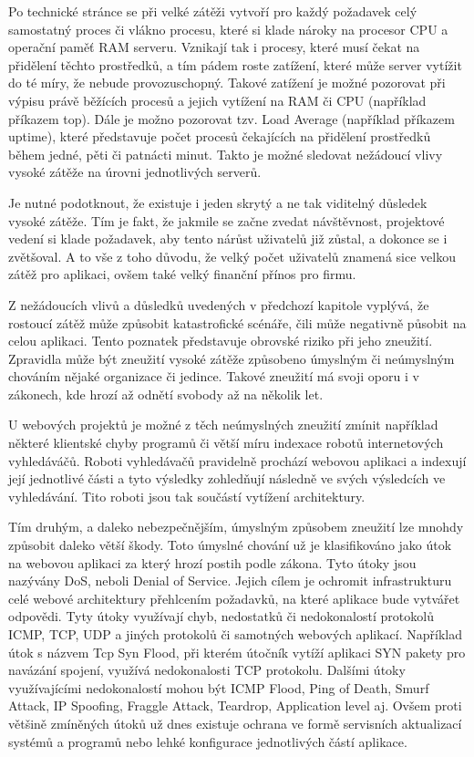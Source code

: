 \documentclass[12pt]{article}
\begin{document}
Po technické stránce se při velké zátěži vytvoří pro každý požadavek celý samostatný proces či vlákno procesu, které si klade nároky na procesor CPU a operační paměť RAM serveru. Vznikají tak i procesy, které musí čekat na přidělení těchto prostředků, a tím pádem roste zatížení, které může server vytížit do té míry, že nebude provozuschopný. Takové zatížení je možné pozorovat při výpisu právě běžících procesů a jejich vytížení na RAM či CPU (například příkazem top). Dále je možno pozorovat tzv. Load Average (například příkazem uptime), které představuje počet procesů čekajících na přidělení prostředků během jedné, pěti či patnácti minut. Takto je možné sledovat nežádoucí vlivy vysoké zátěže na úrovni jednotlivých serverů.\cite{sledovani-zatizeni}

Je nutné podotknout, že existuje i jeden skrytý a ne tak viditelný důsledek vysoké zátěže. Tím je fakt, že jakmile se začne zvedat návštěvnost, projektové vedení si klade požadavek, aby tento nárůst uživatelů již zůstal, a dokonce se i zvětšoval. A to vše z toho důvodu, že velký počet uživatelů znamená sice velkou zátěž pro aplikaci, ovšem také velký finanční přínos pro firmu.



Z nežádoucích vlivů a důsledků uvedených v předchozí kapitole vyplývá, že rostoucí zátěž může způsobit katastrofické scénáře, čili může negativně působit na celou aplikaci. Tento poznatek představuje obrovské riziko při jeho zneužití. Zpravidla může být zneužití vysoké zátěže způsobeno úmyslným či neúmyslným chováním nějaké organizace či jedince. Takové zneužití má svoji oporu i v zákonech, kde hrozí až odnětí svobody až na několik let.

U webových projektů je možné z těch neúmyslných zneužití zmínit například některé klientské chyby programů či větší míru indexace robotů internetových vyhledáváčů. Roboti vyhledávačů pravidelně prochází webovou aplikaci a indexují její jednotlivé části a tyto výsledky zohledňují následně ve svých výsledcích ve vyhledávání. Tito roboti jsou tak součástí vytížení architektury.

Tím druhým, a daleko nebezpečnějším, úmyslným způsobem zneužití lze mnohdy způsobit daleko větší škody. Toto úmyslné chování už je klasifikováno jako útok na webovou aplikaci za který hrozí postih podle zákona. Tyto útoky jsou nazývány DoS, neboli Denial of Service. Jejich cílem je ochromit infrastrukturu celé webové architektury přehlcením požadavků, na které aplikace bude vytvářet odpovědi. Tyty útoky využívají chyb, nedostatků či nedokonalostí protokolů ICMP, TCP, UDP a jiných protokolů či samotných webových aplikací. Například útok s názvem Tcp Syn Flood, při kterém útočník vytíží aplikaci SYN pakety pro navázání spojení, využívá nedokonalosti TCP protokolu. Dalšími útoky využívajícími nedokonalostí mohou být ICMP Flood, Ping of Death, Smurf Attack, IP Spoofing, Fraggle Attack, Teardrop, Application level aj. Ovšem proti většině zmíněných útoků už dnes existuje ochrana ve formě servisních aktualizací systémů a programů nebo lehké konfigurace jednotlivých částí aplikace. \cite{dos}
\end{document}
